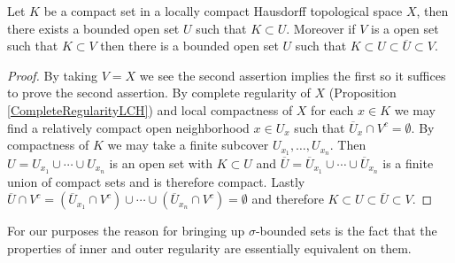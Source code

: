 \begin{lem}\label{BoundedNeighborhoodsOfCompactSets}Let $K$ be a
  compact set in a locally compact Hausdorff topological
  space $X$, then there exists a bounded open set $U$ such that $K
  \subset U$.  Moreover if $V$ is a open set such that $K \subset V$
  then there is a bounded open set $U$ such that $K \subset U \subset
  \overline{U} \subset V$.
\end{lem}
\begin{proof}
By taking $V = X$ we see the second assertion implies the first so it
suffices to prove the second assertion.  By complete regularity of $X$
(Proposition \ref{CompleteRegularityLCH}) and local compactness of $X$
for each $x \in K$ we may
find a relatively compact open neighborhood $x \in U_x$ such that
$\overline{U}_x \cap V^c = \emptyset$.  By compactness of $K$ we may
take a finite subcover $U_{x_1}, \dotsc, U_{x_n}$.  Then
$U = U_{x_1} \cup \dotsb \cup U_{x_n}$ is an open set with $K \subset
U$ and
$\overline{U} = \overline{U}_{x_1} \cup \dotsb \cup \overline{U}_{x_n}$ is
a finite union of
compact sets and is therefore compact.  Lastly $\overline{U} \cap
V^c = (\overline{U}_{x_1} \cap V^c) \cup \dotsb \cup
(\overline{U}_{x_n} \cap V^c) = \emptyset$ and therefore $K \subset U
\subset \overline{U} \subset V$.
\end{proof}

For our purposes the reason for bringing up $\sigma$-bounded sets is
the fact that the properties of inner and outer regularity are
essentially equivalent on them.

